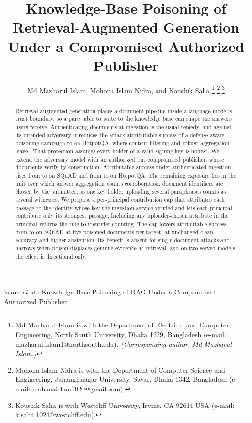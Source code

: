 \documentclass[lettersize,journal]{IEEEtran}
\begin{document}
\title{Knowledge-Base Poisoning of Retrieval-Augmented Generation Under a Compromised
Authorized Publisher}

\author{Md Mazharul Islam, Mohona Islam Nidra, and Koushik Saha%
\thanks{Md Mazharul Islam is with the Department of Electrical and Computer Engineering,
North South University, Dhaka 1229, Bangladesh (e-mail: mazharul.islam1@northsouth.edu).
\emph{(Corresponding author: Md Mazharul Islam.)}}%
\thanks{Mohona Islam Nidra is with the Department of Computer Science and Engineering,
Jahangirnagar University, Savar, Dhaka 1342, Bangladesh (e-mail: mohonaislam1920@gmail.com).}%
\thanks{Koushik Saha is with Westcliff University, Irvine, CA 92614 USA
(e-mail: k.saha.1024@westcliff.edu).}}

%
{Islam \MakeLowercase{\textit{et al.}}: Knowledge-Base Poisoning of RAG Under a Compromised
Authorized Publisher}

\maketitle

\begin{abstract}
Retrieval-augmented generation places a document pipeline inside a language model's trust
boundary, so a party able to write to the knowledge base can shape the answers users receive.
Authenticating documents at ingestion is the usual remedy, and against its intended adversary
it reduces the attack-attributable success of a defense-aware poisoning campaign to
\casrAdaptiveHotpotqafullsigned{} on HotpotQA, where content filtering and robust aggregation
leave \casrAdaptiveHotpotqafull{}. That protection assumes every holder of a valid signing key
is honest. We extend the adversary model with an authorized but compromised publisher, whose
documents verify by construction. Attributable success under authenticated ingestion
rises from \casrAdaptiveSquadfullsigned{} to \compromiseSignedSquadBThree{} on SQuAD and from
\casrAdaptiveHotpotqafullsigned{} to \compromiseSignedHotpotqaBThree{} on HotpotQA. The
remaining exposure lies in the unit over which answer aggregation counts corroboration:
document identifiers are chosen by the submitter, so one key holder uploading several
paraphrases counts as several witnesses. We propose a per-principal contribution cap that
attributes each passage to the identity whose key the ingestion service verified and lets each
principal contribute only its strongest passage. Including any uploader-chosen attribute in
the principal returns the rule to identifier counting. The cap lowers attributable success
from \compromiseSignedSquadBFive{} to \compromiseSignedIndependentSquadBFive{} on SQuAD at five
poisoned documents per target, at unchanged clean accuracy and higher abstention. Its benefit
is absent for single-document attacks and narrows when poison displaces genuine evidence at
retrieval, and on two served models the effect is directional only.
\end{abstract}
\end{document}
